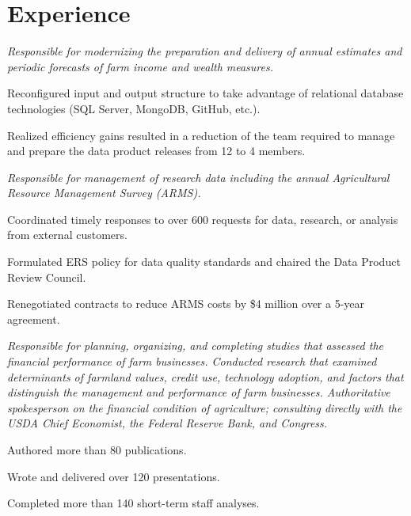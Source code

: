 \documentclass[]{deedy-resume-openfont}
\begin{document}
\begin{minipage}[t]{0.66\textwidth} 


\section{Experience}


\textit{Responsible for modernizing the preparation and delivery of annual estimates and periodic forecasts of farm income and wealth measures.}
\vspace{\topsep} %
\begin{tightemize}
\item Reconfigured input and output structure to take advantage of relational database technologies (SQL Server, MongoDB, GitHub, etc.).
\item Realized efficiency gains resulted in a reduction of the team required to manage and prepare the data product releases from 12 to 4 members.
\end{tightemize}
\sectionsep


\textit{Responsible for management of research data including the annual Agricultural Resource Management Survey (ARMS).}
\begin{tightemize}
\item Coordinated timely responses to over 600 requests for data, research, or analysis from external customers.
\item Formulated ERS policy for data quality standards and chaired the Data Product Review Council.
\item Renegotiated contracts to reduce ARMS costs by \$4 million over a 5-year agreement.
\end{tightemize}
\sectionsep


\textit{Responsible for planning, organizing, and completing studies that
assessed the financial performance of farm businesses.  Conducted research that examined
determinants of farmland values, credit use, technology adoption, and factors that distinguish the management and performance of farm businesses. Authoritative spokesperson on the financial condition of agriculture; consulting directly with the USDA Chief Economist, the Federal Reserve Bank, and Congress.}
\begin{tightemize}
\item Authored more than 80 publications.
\item Wrote and delivered over 120 presentations.
\item Completed more than 140 short-term staff analyses.
\end{tightemize}
\sectionsep


\end{minipage}
\end{document}
